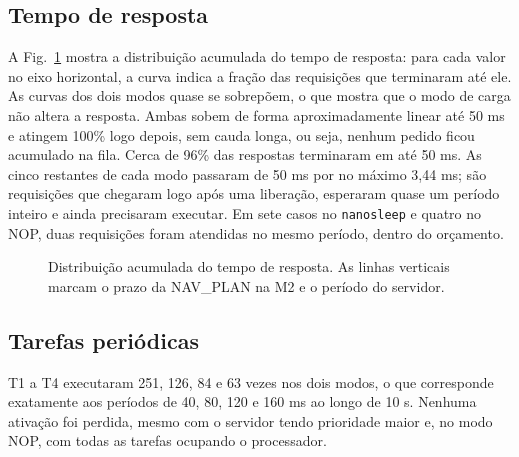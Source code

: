 \documentclass[conference,a4paper]{IEEEtran}
\begin{document}
\subsection{Tempo de resposta}
A Fig.~\ref{fig:resp} mostra a distribuição acumulada do tempo de resposta: para cada valor no eixo horizontal, a curva indica a fração das requisições que terminaram até ele. As curvas dos dois modos quase se sobrepõem, o que mostra que o modo de carga não altera a resposta. Ambas sobem de forma aproximadamente linear até 50 ms e atingem 100\% logo depois, sem cauda longa, ou seja, nenhum pedido ficou acumulado na fila. Cerca de 96\% das respostas terminaram em até 50 ms. As cinco restantes de cada modo passaram de 50 ms por no máximo 3,44 ms; são requisições que chegaram logo após uma liberação, esperaram quase um período inteiro e ainda precisaram executar. Em sete casos no \texttt{nanosleep} e quatro no NOP, duas requisições foram atendidas no mesmo período, dentro do orçamento.

\begin{figure}[!t]
\centering
{}
\caption{Distribuição acumulada do tempo de resposta. As linhas verticais marcam o prazo da NAV\_PLAN na M2 e o período do servidor.}
\label{fig:resp}
\end{figure}

\subsection{Tarefas periódicas}
T1 a T4 executaram 251, 126, 84 e 63 vezes nos dois modos, o que corresponde exatamente aos períodos de 40, 80, 120 e 160 ms ao longo de 10 s. Nenhuma ativação foi perdida, mesmo com o servidor tendo prioridade maior e, no modo NOP, com todas as tarefas ocupando o processador.
\end{document}
